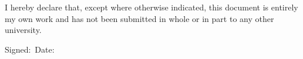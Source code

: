 
\begin{dedication} %
I hereby declare that, except where otherwise indicated, this document is entirely my own work and has not been submitted in whole or in part to any other university.


\vspace*{5ex}

{Signed:\, \underline{\hspace{3cm}}}
{\hfill Date:\, \underline{\hspace{3cm}}}


\end{dedication}


